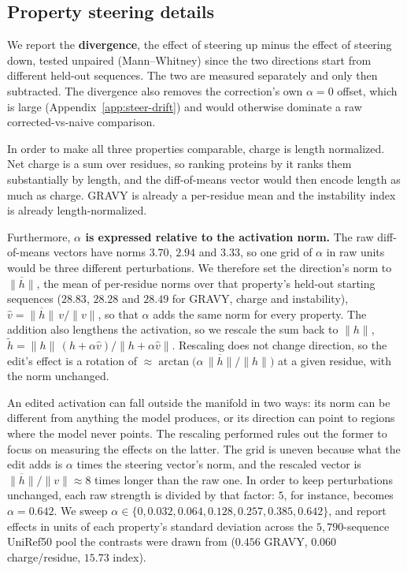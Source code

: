 \documentclass{article}
\begin{document}
\subsection{Property steering details}
\label{app:steer-estimand}

We report the \textbf{divergence}, the effect of steering up minus the effect of steering down,
tested unpaired (Mann--Whitney) since the two directions start from different held-out
sequences. The two are measured separately and only then subtracted. The divergence also removes the
correction's own $\alpha{=}0$ offset, which is large (Appendix~\ref{app:steer-drift}) and would
otherwise dominate a raw corrected-vs-naive comparison. 


In order to make all three properties comparable, charge is length normalized. Net charge is a
sum over residues, so ranking proteins by it ranks them substantially by length, and the
diff-of-means vector would then encode length as much as charge. GRAVY is already a per-residue
mean and the instability index is already length-normalized.

\newpage
Furthermore, \textbf{$\alpha$ is expressed relative to the activation norm.} The raw
diff-of-means vectors have norms $3.70$, $2.94$ and $3.33$, so one grid of $\alpha$ in raw
units would be three different perturbations. We therefore set the direction's norm to
$\overline{\lVert h\rVert}$, the mean of per-residue norms over that property's held-out
starting sequences ($28.83$, $28.28$ and $28.49$ for GRAVY, charge and instability),
$\hat v = \overline{\lVert h\rVert}\,v/\lVert v\rVert$, so that $\alpha$ adds the same norm for
every property. The addition also lengthens the activation, so we rescale the sum back to
$\lVert h\rVert$, $\tilde h = \lVert h\rVert\,(h + \alpha\hat v)/\lVert h + \alpha\hat v\rVert$.
Rescaling does not change direction, so the edit's effect is a rotation of
$\approx\arctan\big(\alpha\,\overline{\lVert h\rVert}/\lVert h\rVert\big)$ at a given residue,
with the norm unchanged. 

An edited activation can fall outside the manifold in two ways: its norm can be different from anything the model produces, or its direction can point to regions where the model never points. The rescaling performed rules out the former to focus on measuring the effects on the latter. The grid is uneven because what the edit adds is $\alpha$ times the steering vector's norm, and
the rescaled vector is $\overline{\lVert h\rVert}/\lVert v\rVert \approx 8$ times longer than
the raw one. In order to keep perturbations unchanged, each raw strength is divided by that factor: $5$, for instance, becomes $\alpha = 0.642$. We sweep
$\alpha \in \{0, 0.032, 0.064, 0.128, 0.257, 0.385, 0.642\}$, and report effects in units of
each property's standard deviation across the $5{,}790$-sequence UniRef50 pool the contrasts
were drawn from ($0.456$ GRAVY, $0.060$ charge/residue, $15.73$ index).
\end{document}
